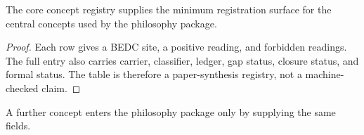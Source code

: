 \begin{theorem}
\label{thm:philosophy-core-concept-registry-closure}
The core concept registry supplies the minimum registration surface for
the central concepts used by the philosophy package.
\end{theorem}
\begin{proof}
Each row gives a BEDC site, a positive reading, and forbidden readings.
The full entry also carries carrier, classifier, ledger, gap status,
closure status, and formal status. The table is therefore a
paper-synthesis registry, not a machine-checked claim.
\end{proof}

\begin{corollary}
\label{cor:philosophy-concept-registry-extension}
A further concept enters the philosophy package only by supplying the
same fields.
\end{corollary}
